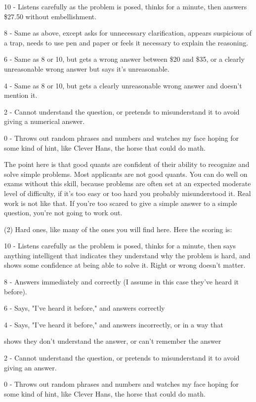 10 - Listens carefully as the problem is posed, thinks for a minute, then answers \$27.50 without embellishment.\par
8 - Same as above, except asks for unnecessary clarification, appears suspicious of a trap, needs to use pen and paper or feels it necessary to explain the reasoning.\par
6 - Same as 8 or 10, but gets a wrong answer between \$20 and \$35, or a clearly unreasonable wrong answer but says it's unreasonable.\par
4 - Same as 8 or 10, but gets a clearly unreasonable wrong answer and doesn't mention it.\par
2 - Cannot understand the question, or pretends to misunderstand it to avoid giving a numerical answer.\par
0 - Throws out random phrases and numbers and watches my face hoping for some kind of hint, like Clever Hans, the horse that could do math.\par

The point here is that good quants are confident of their ability to recognize and solve simple problems. Most applicants are not good quants. You can do well on exams without this skill, because problems are often set at an expected moderate level of difficulty, if it's too easy or too hard you probably misunderstood it. Real work is not like that. If you're too scared to give a simple answer to a simple question, you're not going to work out.\par

(2) Hard ones, like many of the ones you will find here. Here the scoring is:

10 - Listens carefully as the problem is posed, thinks for a minute, then says anything intelligent that indicates they understand why the problem is hard, and shows some confidence at being able to solve it. Right or wrong doesn't matter.\par
8 - Answers immediately and correctly (I assume in this case they've heard it before).\par
6 - Says, "I've heard it before," and answers correctly\par
4 - Says, "I've heard it before," and answers incorrectly, or in a way that\par shows they don't understand the answer, or can't remember the answer\par
2 - Cannot understand the question, or pretends to misunderstand it to avoid giving an answer.\par
0 - Throws out random phrases and numbers and watches my face hoping for some kind of hint, like Clever Hans, the horse that could do math.\par

